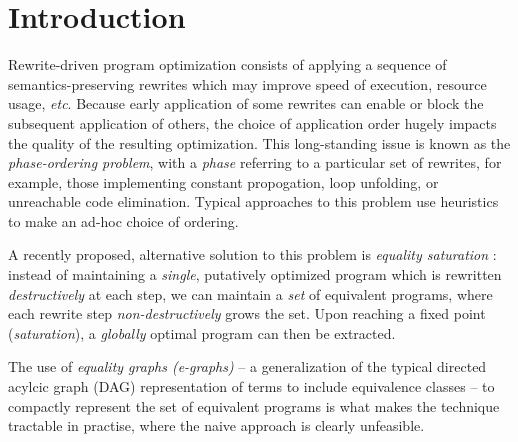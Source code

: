 
\newcommand\mylet[2]{\textsf{let } #1 = #2 \textsf{ in }}


\cite{heijltjes_functional_2023}
\cite{barrett_functional_2023}
\cite{griggio_proceedings_2022}
\cite{flatt_small_2022}
\cite{ghica_operational_2021}
\cite{ghica_hierarchical_2023}
\cite{ghica_rewriting_2023} %
\cite{wilson_string_2023} %

\cite{zhang_relational_2022} %
\cite{alvarez-picallo_rewriting_2022} %
\cite{alvarez-picallo_functorial_2021} %

\cite{bonchi_tape_nodate} %
\cite{baldan_categorical_2014} %
\cite{dpo}
\cite{maclane}
\cite{singher2023colored}



\section{Introduction}

Rewrite-driven program optimization consists of applying a sequence of semantics-preserving rewrites which may improve speed of execution, resource usage, \textit{etc}. Because early application of some rewrites can enable or block the subsequent application of others, the choice of application order hugely impacts the quality of the resulting optimization.  This long-standing issue is known as the \textit{phase-ordering problem}, with a \textit{phase} referring to a particular set of rewrites, for example,  those implementing constant propogation, loop unfolding, or unreachable code elimination. Typical approaches to this problem use heuristics to make an ad-hoc choice of ordering. 

A recently proposed,  alternative solution to this problem is \textit{equality saturation} 
\cite{10.1145/1594834.1480915}: instead of maintaining a \textit{single},  putatively optimized program which is rewritten \textit{destructively} at each step, we can maintain a \textit{set} of equivalent programs, where each rewrite step \textit{non-destructively} grows the set.  Upon reaching a fixed point (\textit{saturation}),  a \textit{globally} optimal program can then be extracted.%

The use of \textit{equality graphs (e-graphs)} \cite{EggPaper} -- a generalization of the typical directed acylcic graph (DAG) representation of terms to include equivalence classes -- to compactly represent the set of equivalent programs is what makes the technique tractable in practise, where the naive approach is clearly unfeasible. 

